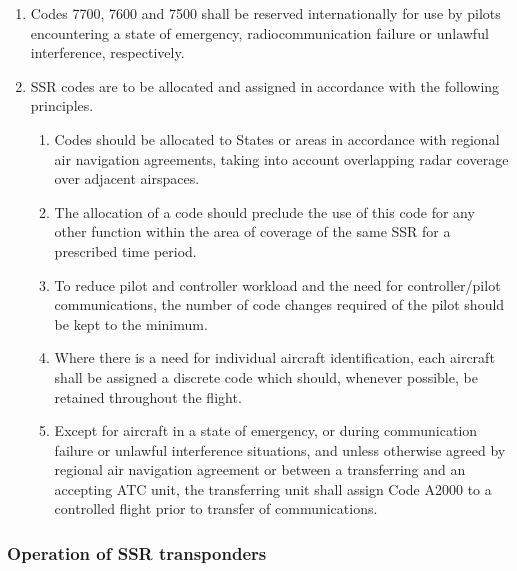 \begin{enumerate}
    \item Codes 7700, 7600 and 7500 shall be reserved internationally for use by pilots encountering a state of emergency, radiocommunication failure or unlawful interference, respectively.
    \item SSR codes are to be allocated and assigned in accordance with the following principles.
    
    \begin{enumerate}
        \item Codes should be allocated to States or areas in accordance with regional air navigation agreements, taking into account overlapping radar coverage over adjacent airspaces.
        

        \item The allocation of a code should preclude the use of this code for any other function within the area of coverage of the same SSR for a prescribed time period.
        \item To reduce pilot and controller workload and the need for controller/pilot communications, the number of code changes required of the pilot should be kept to the minimum.


        \item Where there is a need for individual aircraft identification, each aircraft shall be assigned a discrete code which should, whenever possible, be retained throughout the flight.
        \item Except for aircraft in a state of emergency, or during communication failure or unlawful interference situations, and unless otherwise agreed by regional air navigation agreement or between a transferring and an accepting ATC unit, the transferring unit shall assign Code A2000 to a controlled flight prior to transfer of communications.
    \end{enumerate}

\end{enumerate}

\subsubsection{Operation of SSR transponders}


